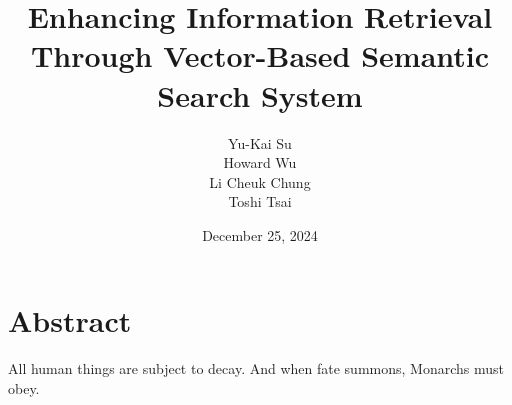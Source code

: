 \documentclass{article}
\title{Enhancing Information Retrieval Through Vector-Based Semantic Search System}
\author{
    Yu-Kai Su \\
    Howard Wu \\
    Li Cheuk Chung \\
    Toshi Tsai
}
\date{December 25, 2024}
\begin{document}
\maketitle


\section{Abstract}
All human things are subject to decay. And when fate summons, Monarchs must obey.













\end{document}
